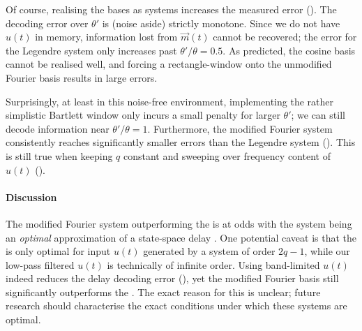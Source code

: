 Of course, realising the bases as \LTI systems increases the measured error ().
The decoding error over $\theta'$ is (noise aside) strictly monotone.
Since we do not have $u(t)$ in memory, information lost from $\vec m(t)$ cannot be recovered; the error for the Legendre system only increases past $\theta' / \theta = 0.5$.
As predicted, the cosine basis cannot be realised well, and forcing a rectangle-window onto the unmodified Fourier basis results in large errors.

Surprisingly, at least in this noise-free environment, implementing the rather simplistic Bartlett window only incurs a small penalty for larger $\theta'$; we can still decode information near $\theta' / \theta = 1$.
Furthermore, the modified Fourier system consistently reaches significantly smaller errors than the Legendre system ().
This is still true when keeping $q$ constant and sweeping over frequency content of $u(t)$ ().

\paragraph{Discussion}
The modified Fourier system outperforming the \LDN is at odds with the \LDN system being an \emph{optimal} approximation of a state-space delay \citep[Section~6.1.1]{voelker2019}.
One potential caveat is that the \LDN is only optimal for input $u(t)$ generated by a system of order $2q - 1$, while our low-pass filtered $u(t)$ is technically of infinite order.
Using band-limited $u(t)$ indeed reduces the delay decoding error (), yet the modified Fourier basis still significantly outperforms the \LDN.
The exact reason for this is unclear; future research should characterise the exact conditions under which these \LTI systems are optimal.
